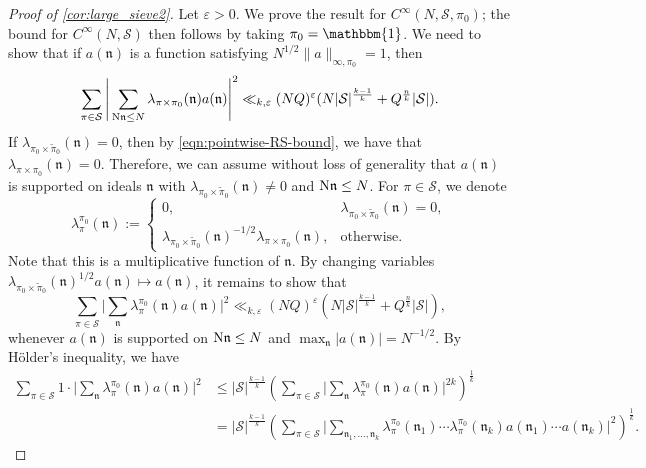 \documentclass[11pt]{amsart}
\theoremstyle{remark}
\numberwithin{equation}{section}
\newcommand{\kn}{\mathfrak{n}}
\newcommand{\N}{\textnormal{N}}
\newcommand{\mS}{\mathcal{S}}
\newcommand{\one}{\mathbbm{1}}
\renewcommand{\tilde}{\widetilde}
\renewcommand{\epsilon}{\varepsilon}
\begin{document}
\begin{proof}[Proof of \cref{cor:large_sieve2}]
Let $\epsilon>0$.  We prove the result for $C^\infty(N, \mS, \pi_0)$; the bound for $C^\infty(N, \mS)$ then follows by taking $\pi_0 = \one$. We need to show that if $a(\kn)$ is a function satisfying $N^{1/2} \|a\|_{\infty,\pi_0} = 1$, then
\[
    \sum_{\pi\in\mathcal{S}}\Bigg|\sum_{\N\kn\leq N}\lambda_{\pi\times\pi_0}(\kn)a(\kn)\Bigg|^2
    \ll_{k,\epsilon} (NQ)^{\epsilon} (N|\mS|^{\frac{k-1}{k}} + Q^{\frac{n}{k}}|\mS|).
\]
If $\lambda_{\pi_0\times\tilde{\pi}_0}(\kn)=0$, then by \eqref{eqn:pointwise-RS-bound}, we have that $\lambda_{\pi\times\pi_0}(\kn)=0$.  Therefore, we can assume without loss of generality that $a(\kn)$ is supported on ideals $\kn$ with $\lambda_{\pi_0 \times \tilde\pi_0}(\kn) \neq 0$ and $\N \kn \le N$. For $\pi \in \mS$, we denote
\begin{equation} \label{eqn:twist-pi0}
    \lambda^{\pi_0}_\pi(\kn) := 
    \begin{cases}
        0, &\lambda_{\pi_0 \times \tilde\pi_0}(\kn) = 0, \\ 
        \lambda_{\pi_0 \times \tilde\pi_0}(\kn)^{-1/2} \lambda_{\pi \times \pi_0}(\kn), & 
        \text{otherwise.}
    \end{cases}
\end{equation}
Note that this is a multiplicative function of $\kn$.  By changing variables $\lambda_{\pi_0 \times \tilde\pi_0}(\kn)^{1/2} a(\kn) \mapsto a(\kn)$, it remains to show that
\begin{equation} \label{eqn:holder-cor-to-show}
    \sum_{\pi\in\mathcal{S}}\Bigg|\sum_\kn \lambda^{\pi_0}_\pi(\kn)a(\kn)\Bigg|^2 \ll_{k,\epsilon} (NQ)^{\epsilon} (N|\mS|^{\frac{k-1}{k}} + Q^{\frac{n}{k}}|\mS|),
\end{equation}
whenever $a(\kn)$ is supported on $\N \kn \le N$ and $\max_\kn |a(\kn)| = N^{-1/2}$. By H\"older's inequality, we have
\begin{equation} \label{eqn:holder-step}
\begin{aligned}
    \sum_{\pi\in\mathcal{S}} 1 \cdot \Bigg|\sum_{\kn}\lambda^{\pi_0}_{\pi}(\kn)a(\kn)\Bigg|^2
    &\le 
    |\mS|^{\frac{k-1}{k}}
    \left( \sum_{\pi\in\mathcal{S}} \Bigg|\sum_{\kn}\lambda^{\pi_0}_{\pi}(\kn)a(\kn)\Bigg|^{2k} \right)^{\frac{1}{k}}
    \\
    &= 
    |\mS|^{\frac{k-1}{k}}
    \left( \sum_{\pi\in\mathcal{S}} \Bigg|\sum_{\kn_1, \ldots, \kn_k}\lambda^{\pi_0}_{\pi}(\kn_1) \cdots \lambda^{\pi_0}_{\pi}(\kn_k) a(\kn_1) \cdots a(\kn_k)\Bigg|^2 \right)^{\frac{1}{k}}.
\end{aligned}
\end{equation}


\end{proof}
\end{document}
